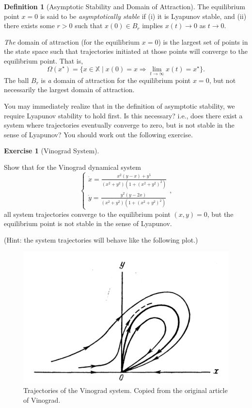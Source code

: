 \documentclass[
]{book}
\theoremstyle{definition}
\newtheorem{definition}{Definition}[chapter]
\theoremstyle{definition}
\theoremstyle{definition}
\newtheorem{exercise}{Exercise}[chapter]
\theoremstyle{definition}
\theoremstyle{remark}
\begin{document}
\begin{definition}[Asymptotic Stability and Domain of Attraction]
\protect\hypertarget{def:asymptoticstability}{}\label{def:asymptoticstability}The equilibrium point \(x = 0\) is said to be \emph{asymptotically stable} if (i) it is Lyapunov stable, and (ii) there exists some \(r > 0\) such that \(x(0) \in B_r\) implies \(x(t) \rightarrow 0\) as \(t \rightarrow 0\).

\emph{The} domain of attraction (for the equilibrium \(x=0\)) is the largest set of points in the state space such that trajectories initiated at those points will converge to the equilibrium point. That is,
\[
\Omega(x^\star) = \{ x \in \mathbb{X} \mid x(0) = x \Longrightarrow \lim_{t \rightarrow \infty} x(t) = x^\star \}.
\]
The ball \(B_r\) is \emph{a} domain of attraction for the equilibrium point \(x=0\), but not necessarily the largest domain of attraction.
\end{definition}

You may immediately realize that in the definition of asymptotic stability, we require Lyapunov stability to hold first. Is this necessary? i.e., does there exist a system where trajectories eventually converge to zero, but is not stable in the sense of Lyapunov? You should work out the following exercise.

\begin{exercise}[Vinograd System]
\protect\hypertarget{exr:vinogradequation}{}\label{exr:vinogradequation}

Show that for the Vinograd dynamical system \citep{vinograd57-inapplicability}
\[
\begin{cases}
\dot{x} = \frac{x^2(y-x) + y^5}{(x^2+y^2)(1 + (x^2+y^2)^2)} \\
\dot{y} = \frac{y^2 (y - 2x)}{(x^2+y^2)(1 + (x^2+y^2)^2)}
\end{cases},
\]
all system trajectories converge to the equilibrium point \((x,y) = 0\), but the equilibrium point is not stable in the sense of Lyapunov.

(Hint: the system trajectories will behave like the following plot.)

\begin{figure}

{\centering \includegraphics[width=0.6\linewidth]{images/vinograd} 

}

\caption{Trajectories of the Vinograd system. Copied from the original article of Vinograd.}\label{fig:vinograd-system}
\end{figure}

\end{exercise}
\end{document}
